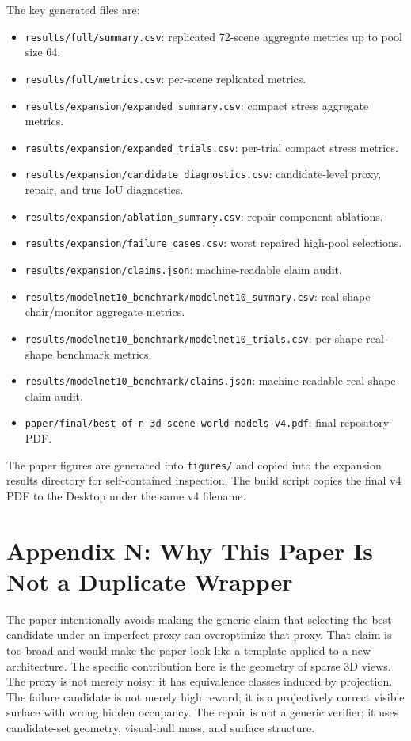 \documentclass{article}
\begin{document}
The key generated files are:
\begin{itemize}
  \item \texttt{results/full/summary.csv}: replicated 72-scene aggregate
  metrics up to pool size 64.
  \item \texttt{results/full/metrics.csv}: per-scene replicated metrics.
  \item \texttt{results/expansion/expanded\_summary.csv}: compact stress
  aggregate metrics.
  \item \texttt{results/expansion/expanded\_trials.csv}: per-trial compact stress
  metrics.
  \item \texttt{results/expansion/candidate\_diagnostics.csv}: candidate-level
  proxy, repair, and true IoU diagnostics.
  \item \texttt{results/expansion/ablation\_summary.csv}: repair component
  ablations.
  \item \texttt{results/expansion/failure\_cases.csv}: worst repaired
  high-pool selections.
  \item \texttt{results/expansion/claims.json}: machine-readable claim audit.
  \item \texttt{results/modelnet10\_benchmark/modelnet10\_summary.csv}: real-shape
  chair/monitor aggregate metrics.
  \item \texttt{results/modelnet10\_benchmark/modelnet10\_trials.csv}: per-shape
  real-shape benchmark metrics.
  \item \texttt{results/modelnet10\_benchmark/claims.json}: machine-readable
  real-shape claim audit.
  \item \texttt{paper/final/best-of-n-3d-scene-world-models-v4.pdf}: final
  repository PDF.
\end{itemize}

The paper figures are generated into \texttt{figures/} and copied into the
expansion results directory for self-contained inspection. The build script
copies the final v4 PDF to the Desktop under the same v4 filename.

\section{Appendix N: Why This Paper Is Not a Duplicate Wrapper}

The paper intentionally avoids making the generic claim that selecting the best
candidate under an imperfect proxy can overoptimize that proxy. That claim is
too broad and would make the paper look like a template applied to a new
architecture. The specific contribution here is the geometry of sparse 3D
views. The proxy is not merely noisy; it has equivalence classes induced by
projection. The failure candidate is not merely high reward; it is a
projectively correct visible surface with wrong hidden occupancy. The repair is
not a generic verifier; it uses candidate-set geometry, visual-hull mass, and
surface structure.
\end{document}
